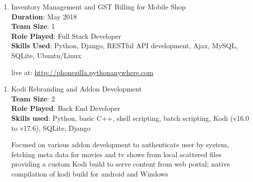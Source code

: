 \documentclass[a4paper, 14pt]{article}
\begin{document}
%		
	
	
	\begin{enumerate}[start=1,label={\bfseries $\Rightarrow$ TITLE - }]
		\addtolength{\itemindent}{40pt}
		\item Inventory Management and GST Billing for Mobile Shop
		\\ \textbf{Duration}: May 2018
		\\ \textbf{Team Size}: 1
		\\ \textbf{Role Played}: Full Stack Developer
		\\ \textbf{Skills Used}: Python, Django, RESTful API development, Ajax, MySQL, SQLite, Ubuntu/Linux
		
		live at: \url{http://phonezilla.pythonanywhere.com}
	\end{enumerate}
	
	\begin{enumerate}[start=1,label={\bfseries $\Rightarrow$ TITLE - }]
		\addtolength{\itemindent}{40pt}
		\item Kodi Rebranding and Addon Development
		\\ \textbf{Team Size}: 2
		\\ \textbf{Role Played}: Back End Developer
		\\ \textbf{Skills used}: Python, basic C++, shell scripting, batch scripting, Kodi (v16.0 to v17.6), SQLite, Django
		
		Focused on various addon development to authenticate user by system, fetching meta data for movies and tv shows from local scattered files providing a custom Kodi build to serve content from web portal; native compilation of kodi build for android and Windows
	\end{enumerate}
	
\end{document}

